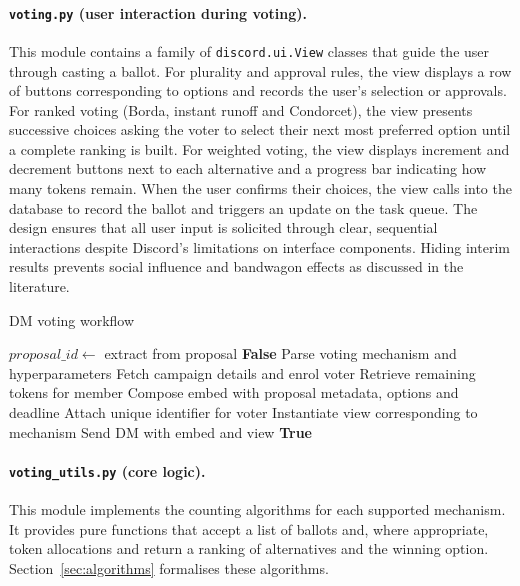 \paragraph{\texttt{voting.py} (user interaction during voting).}
This module contains a family of \texttt{discord.ui.View} classes that
guide the user through casting a ballot.  For plurality and approval
rules, the view displays a row of buttons corresponding to options and
records the user’s selection or approvals.  For ranked voting
(Borda, instant runoff and Condorcet), the view presents successive
choices asking the voter to select their next most preferred option
until a complete ranking is built.  For weighted voting, the view
displays increment and decrement buttons next to each alternative and a
progress bar indicating how many tokens remain.  When the user
confirms their choices, the view calls into the database to record the
ballot and triggers an update on the task queue.  The design ensures
that all user input is solicited through clear, sequential interactions
despite Discord’s limitations on interface components.  Hiding interim
results prevents social influence and bandwagon effects as discussed in
the literature.

\begin{algorithm}
    \caption{DM voting workflow}\label{alg:dm_voting}
    \begin{algorithmic}[1]
            \State $proposal\_id \leftarrow$ extract from proposal
             \State \Return \textbf{False} \EndIf
            \State Parse voting mechanism and hyperparameters
                \State Fetch campaign details and enrol voter
                \State Retrieve remaining tokens for member
            \EndIf
            \State Compose embed with proposal metadata, options and deadline
                \State Attach unique identifier for voter
            \EndIf
            \State Instantiate view corresponding to mechanism
            \State Send DM with embed and view
            \State \Return \textbf{True}
        \EndProcedure
    \end{algorithmic}
\end{algorithm}

\paragraph{\texttt{voting\_utils.py} (core logic).}
This module implements the counting algorithms for each supported
mechanism.  It provides pure functions that accept a list of ballots
and, where appropriate, token allocations and return a ranking of
alternatives and the winning option.  Section~\ref{sec:algorithms}
formalises these algorithms.

